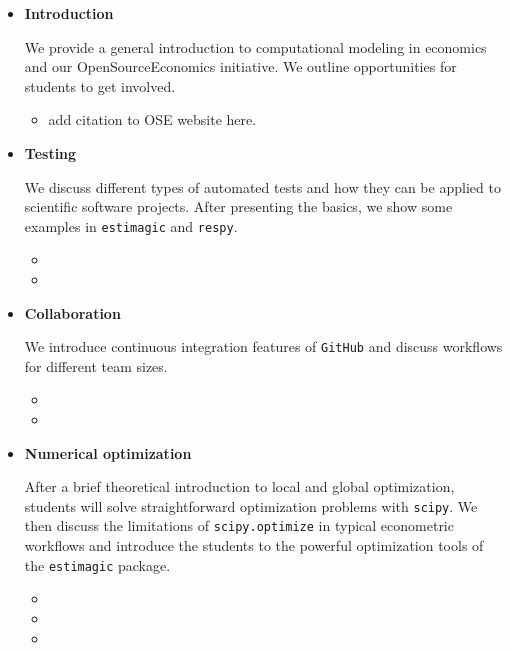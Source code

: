 \begin{itemize}

\item \textbf{Introduction}

We provide a general introduction to computational modeling in economics and our OpenSourceEconomics initiative. We outline opportunities for students to get involved.

\begin{itemize}
  \item add citation to OSE website here.
\end{itemize}

\item \textbf{Testing}

We discuss different types of automated tests and how they can be applied to scientific software projects. After presenting the basics, we show some examples in \verb+estimagic+ and \verb+respy+.

\begin{itemize}
  \item {}
  \item {}
\end{itemize}


\item \textbf{Collaboration}

We introduce continuous integration features of \verb+GitHub+ and discuss workflows for different team sizes.

\begin{itemize}
  \item {}
  \item {}
\end{itemize}

\item \textbf{Numerical optimization}

After a brief theoretical introduction to local and global optimization, students will solve straightforward optimization problems with \verb+scipy+. We then discuss the limitations of \verb+scipy.optimize+ in typical econometric workflows and introduce the students to the powerful optimization tools of the \verb+estimagic+ package.

\begin{itemize}
  \item {}
  \item {}
  \item {}
\end{itemize}


\end{itemize}
